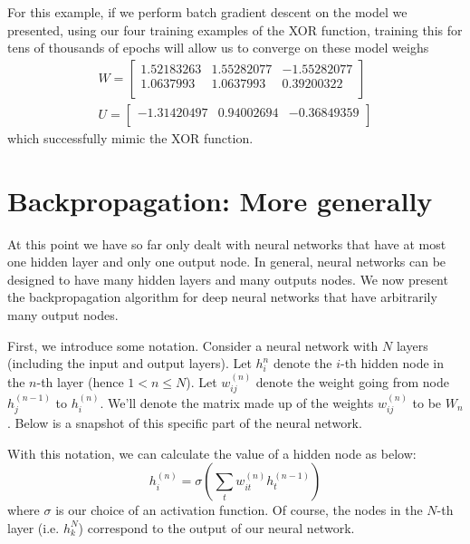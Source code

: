 \documentclass[12pt,letterpaper]{book}
\theoremstyle{definition}
\begin{document}
  For this example, if we perform batch gradient descent on the model we presented, using our 
  four training examples of the XOR function,
  training this for tens of thousands of epochs
  will allow us to converge on these model weighs 
  \begin{align}
    W = 
    \begin{bmatrix}
      1.52183263 & 1.55282077 & -1.55282077 \\
      1.0637993 & 1.0637993 & 0.39200322 \\
    \end{bmatrix}\\
    U = \begin{bmatrix}
      -1.31420497 & 0.94002694 & -0.36849359\\
    \end{bmatrix}
  \end{align}
  which successfully mimic the XOR function.

  
  \section{Backpropagation: More generally}
    At this point we have so far only dealt with neural networks that have at 
    most one hidden layer and only one output node. In general, neural networks can be designed 
    to have many hidden layers and many outputs nodes. We now present the backpropagation
    algorithm for deep neural networks that have arbitrarily many output nodes.

    First, we introduce some notation.
    Consider a neural network with $N$ layers (including the input and output layers).
    Let $h_i^{n}$ denote the $i$-th hidden node in the $n$-th layer (hence $1 < n \le N$).
    Let $w_{ij}^{(n)}$ denote the weight going from node 
    $h_j^{(n-1)}$ to $h_i^{(n)}$. We'll denote the 
    matrix made up of the weights $w_{ij}^{(n)}$ to be $W_n$.
    Below is a snapshot 
    of this specific part of the neural network.

    \begin{center}
    \end{center}
    With this notation, we can calculate the value of a hidden node as below:
    \[
      h_i^{(n)} = \sigma\left(\sum_{t}w^{(n)}_{it}h^{(n-1)}_t\right)
    \]
    where $\sigma$ is our choice of an activation function.
      Of course, the nodes in the $N$-th layer (i.e. $h_k^N$) correspond to the output of our neural network.
\end{document}
